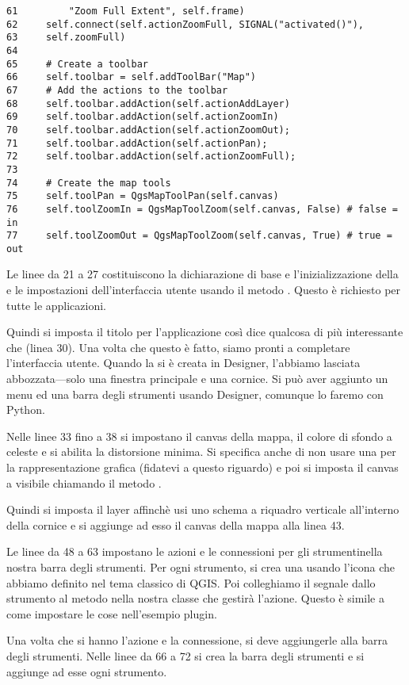 \begin{verbatim}
61         "Zoom Full Extent", self.frame)
62     self.connect(self.actionZoomFull, SIGNAL("activated()"),
63     self.zoomFull)
64 
65     # Create a toolbar
66     self.toolbar = self.addToolBar("Map")
67     # Add the actions to the toolbar
68     self.toolbar.addAction(self.actionAddLayer)
69     self.toolbar.addAction(self.actionZoomIn)
70     self.toolbar.addAction(self.actionZoomOut);
71     self.toolbar.addAction(self.actionPan);
72     self.toolbar.addAction(self.actionZoomFull);
73 
74     # Create the map tools
75     self.toolPan = QgsMapToolPan(self.canvas)
76     self.toolZoomIn = QgsMapToolZoom(self.canvas, False) # false = in
77     self.toolZoomOut = QgsMapToolZoom(self.canvas, True) # true = out
\end{verbatim}

Le linee da 21 a 27 costituiscono la dichiarazione di base e l'inizializzazione della 
 e le impostazioni dell'interfaccia utente usando il metodo 
. Questo è richiesto per tutte le applicazioni.

Quindi si imposta il titolo per l'applicazione così dice qualcosa di più interessante che  (linea 30). Una volta che questo è fatto, siamo pronti a completare l'interfaccia utente. Quando la si è creata in Designer, l'abbiamo lasciata abbozzata---solo una finestra principale e una cornice. Si può aver aggiunto un menu ed una barra degli strumenti usando Designer, comunque lo faremo con Python.

Nelle linee 33 fino a 38 si impostano il canvas della mappa, il colore di sfondo a celeste e si abilita la distorsione minima. Si specifica anche di non usare una  per la rappresentazione grafica (fidatevi a questo riguardo) e poi si imposta il canvas a visibile chiamando il metodo .

Quindi si imposta il layer affinchè usi uno schema a riquadro verticale all'interno della cornice e si aggiunge ad esso il canvas della mappa alla linea 43.

Le linee da 48 a 63 impostano le azioni e le connessioni per gli strumentinella nostra barra degli strumenti. Per ogni strumento, si crea una  usando l'icona che abbiamo definito nel tema classico di QGIS. Poi colleghiamo il segnale  dallo strumento al metodo nella nostra classe che gestirà l'azione. Questo è simile a come impostare le cose nell'esempio plugin.

Una volta che si hanno l'azione e la connessione, si deve aggiungerle alla barra degli strumenti.
Nelle linee da 66 a 72 si crea la barra degli strumenti e si aggiunge ad esse ogni strumento.


